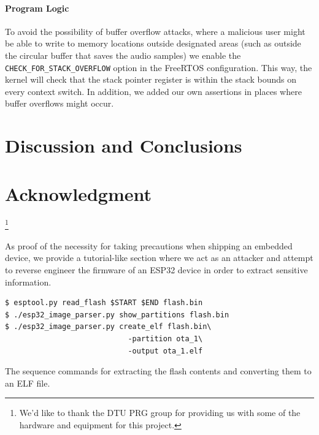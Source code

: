 \documentclass[conference]{IEEEtran}
\begin{document}
\paragraph{Program Logic}

To avoid the possibility of buffer overflow attacks, where a malicious user might be able 
to write to memory locations outside designated areas (such as outside the circular buffer that saves
the audio samples) we enable the \texttt{CHECK\_FOR\_STACK\_OVERFLOW} option in the FreeRTOS configuration.
This way, the kernel will check that the stack pointer register is within the stack bounds on every context switch.
In addition, we added our own assertions in places where buffer overflows might occur.


\section{Discussion and Conclusions}
\label{sec:discussion_and_conclusions}

\section*{Acknowledgment}

\thanks{We'd like to thank the DTU PRG group for providing us with some of the hardware and equipment for this project.}




\appendices
{}

\label{appendix:reverse_engineering}

As proof of the necessity for taking precautions when shipping an embedded device, 
we provide a tutorial-like section where we act as an attacker and attempt to reverse engineer the firmware of an ESP32
device in order to extract sensitive information.

\begin{listing}[h]
\begin{verbatim}
$ esptool.py read_flash $START $END flash.bin
$ ./esp32_image_parser.py show_partitions flash.bin
$ ./esp32_image_parser.py create_elf flash.bin\
                            -partition ota_1\
                            -output ota_1.elf
\end{verbatim}
\caption{The sequence commands for extracting the flash contents and converting them to an ELF file.}
\end{listing}
\end{document}

